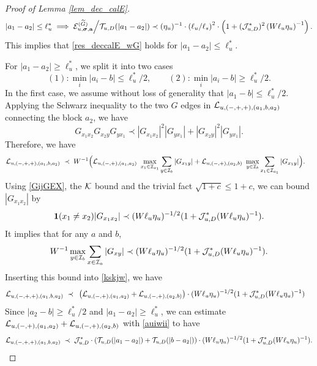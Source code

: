\documentclass[10pt,reqno]{article}
\theoremstyle{plain} %
\theoremstyle{remark}
\numberwithin{equation}{section}
\begin{document}
\begin{proof}[Proof of Lemma \ref{lem_dec_calE}]
\begin{align}\label{82jjdopasj}
 |a_1-a_2|\le \ell_u^*\implies  \mathcal{E}_{u, \boldsymbol{\sigma}, \mathbf{a}}^{(\widetilde{G})} \Big/{\cal T}_{u,D}(|a_1-a_2|)\prec 
 (\eta_u)^{-1} \cdot \left(\ell_u / \ell_s\right)^2\cdot   \left(1+  (\mathcal{J}_{u, D}^*)^2 \left(W \ell_u \eta_u\right)^{-1 }\right).
 \end{align}
This implies that   \eqref{res_deccalE_wG} holds for $|a_1-a_2|\le \ell_u^*$. 



For   $|a_1-a_2|\ge \ell_u^*$,  we split it into  two cases  
 $$
 (1): \min_i|a_i-b|\le \ell_u^*/2,\quad \quad 
 (2): \min_i|a_i-b|\ge \ell_u^*/2.
 $$
In the first case,  we assume without loss of generality that $|a_1-b|\le \ell_u^*/2$. Applying  the Schwarz inequality to  the two $G$ edges  in ${\cal L}_{u, (-,+,+),(a_1, b , a_2)}$ connecting the block $a_2$,  we have 
$$
G_{x_1x_2}G_{x_2y}G_{yx_1}\prec |G_{x_1x_2}|^2|G_{yx_1}|+
|G_{ x_2 y}|^2|G_{yx_1}|.
$$
Therefore, we have 
\begin{align}\label{kskjw}
  {\cal L}_{u, (-,+,+),(a_1, b , a_2)}
  \;\prec\; &\;  W^{-1} \Big ( {\cal L}_{u, (-,+),(a_1, a_2)} \ \max_{x_1\in {\cal I}_{a_1}}\sum_{y\in {\cal I}_{b}}|G_{x_1y}|+ {\cal L}_{u, (-,+),(a_2, b)}\ \max_{y\in {\cal I}_{b}}\sum_{x_1\in {\cal I}_{a_1}}|G_{x_1y}| \Big )  .
\end{align}
Using \eqref{GijGEX},  the $\cal K$ bound and the trivial fact $\sqrt { 1+c } \le 1+c $,  we can bound $|G_{x_1x_2}|$ by 
$$
{\bf 1}(x_1\ne x_2)|G_{x_1x_2}|\prec (W\ell_u\eta_u)^{-1/2}(1+{\cal J}^*_{u,D}(W\ell_u\eta_u)^{-1}).
$$
It implies that for any $a $ and $b$, 
\begin{align}\label{jaysw2002}
  W^{-1}  \max_{y\in{\cal I}_b}\sum_{x\in{\cal I}_a}|G_{xy}|\prec (W\ell_u\eta_u)^{-1/2}(1+{\cal J}^*_{u,D}(W\ell_u\eta_u)^{-1}).
\end{align}
Inserting  this bound  into \eqref{kskjw}, we have 
\begin{align}
  {\cal L}_{u, (-,+,+),(a_1, b , a_2)}
     \;\prec\; &\;\left( {\cal L}_{u, (-,+),(a_1, a_2)}   + {\cal L}_{u, (-,+),(a_2, b)}  \right)  \cdot (W\ell_u\eta_u)^{-1/2}(1+{\cal J}^*_{u,D}(W\ell_u\eta_u)^{-1})
\end{align}
 Since $|a_2-b|\ge \ell_u^*/2$ and $|a_1-a_2|\ge  \ell_u^*$,  we can estimate  $ {\cal L}_{u, (-,+),(a_1, a_2)}   + {\cal L}_{u, (-,+),(a_2, b)}$ 
with \eqref{auiwii} to have  
$$
 {\cal L}_{u, (-,+,+),(a_1, b , a_2)} \;\prec\; {\cal J}^*_{u,D}\cdot \left(  {\cal T}_{u,D}(|a_1-a_2|)+{\cal T}_{u,D}(|b-a_2|) \right)  \cdot (W\ell_u\eta_u)^{-1/2}(1+{\cal J}^*_{u,D}(W\ell_u\eta_u)^{-1}).
$$
\end{proof}
\end{document}
